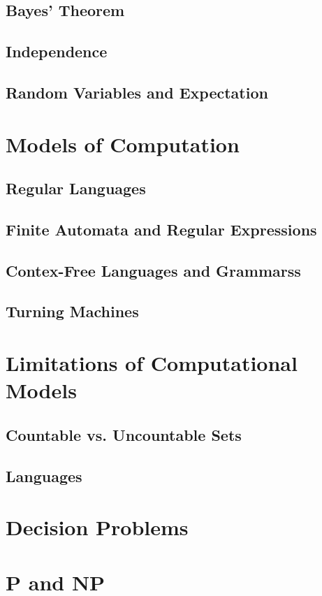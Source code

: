 \documentclass[a4paper]{article}
\begin{document}
\begin{multicols}{2}
	\subsection{Bayes' Theorem}
	\subsection{Independence}
	\subsection{Random Variables and Expectation}

	\section{Models of Computation}
	\subsection{Regular Languages}
	\subsection{Finite Automata and Regular Expressions}
	\subsection{Contex-Free Languages and Grammarss}
	\subsection{Turning Machines}

	\section{Limitations of Computational Models}
	\subsection{Countable vs. Uncountable Sets}
	\subsection{Languages}

	\section{Decision Problems}

	\section{P and NP}

\end{multicols}
\end{document}
